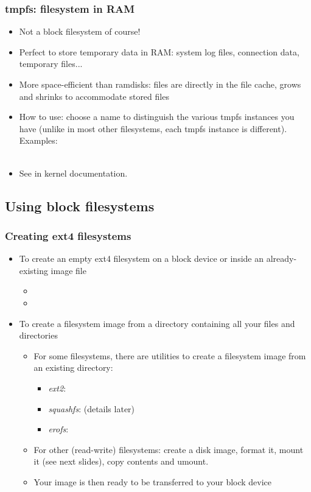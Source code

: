 \begin{frame}
  \frametitle{tmpfs: filesystem in RAM}
  \begin{itemize}
  \item Not a block filesystem of course!
  \item Perfect to store temporary data in RAM: system log files,
    connection data, temporary files...
  \item More space-efficient than ramdisks: files are directly in the
    file cache, grows and shrinks to accommodate stored files
  \item How to use: choose a name to distinguish the various tmpfs
    instances you have (unlike in most other filesystems, each
    tmpfs instance is different). Examples:\\
    \\
  \item See  in kernel documentation.
  \end{itemize}
\end{frame}

\subsection{Using block filesystems}

\begin{frame}
  \frametitle{Creating ext4 filesystems}
  \begin{itemize}
  \item To create an empty ext4 filesystem on a block device or
    inside an already-existing image file
    \begin{itemize}
    \item {}
    \item {}
    \end{itemize}
  \item To create a filesystem image from a directory containing all
    your files and directories
    \begin{itemize}
    \item For some filesystems, there are utilities to create a
          filesystem image from an existing directory:
          \begin{itemize}
          \item {\em ext2}: 
	      \item {\em squashfs}:  (details later)
          \item {\em erofs}: 
          \end{itemize}
    \item For other (read-write) filesystems: create a disk image,
          format it, mount it (see next slides), copy contents and umount.
    \item Your image is then ready to be transferred to your block device
    \end{itemize}
  \end{itemize}
\end{frame}

